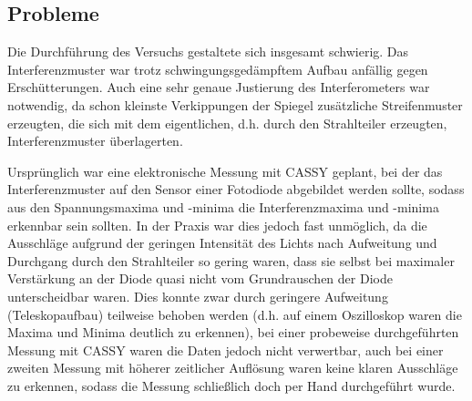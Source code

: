 \subsection{Probleme}
Die Durchführung des Versuchs gestaltete sich insgesamt schwierig. Das Interferenzmuster war trotz schwingungsgedämpftem Aufbau anfällig gegen Erschütterungen. Auch eine sehr genaue Justierung des Interferometers war notwendig, da schon kleinste Verkippungen der Spiegel zusätzliche Streifenmuster erzeugten, die sich mit dem eigentlichen, d.h. durch den Strahlteiler erzeugten, Interferenzmuster überlagerten.

Ursprünglich war eine elektronische Messung mit CASSY geplant, bei der das Interferenzmuster auf den Sensor einer Fotodiode abgebildet werden sollte, sodass aus den Spannungsmaxima und -minima die Interferenzmaxima und -minima erkennbar sein sollten.
In der Praxis war dies jedoch fast unmöglich, da die Ausschläge aufgrund der geringen Intensität des Lichts nach Aufweitung und Durchgang durch den Strahlteiler so gering waren, dass sie selbst bei maximaler Verstärkung an der Diode quasi nicht vom Grundrauschen der Diode unterscheidbar waren. Dies konnte zwar durch geringere Aufweitung (Teleskopaufbau) teilweise behoben werden (d.h. auf einem Oszilloskop waren die Maxima und Minima deutlich zu erkennen), bei einer probeweise durchgeführten Messung mit CASSY waren die Daten jedoch nicht verwertbar, auch bei einer zweiten Messung mit höherer zeitlicher Auflösung waren keine klaren Ausschläge zu erkennen, sodass die Messung schließlich doch per Hand durchgeführt wurde.
